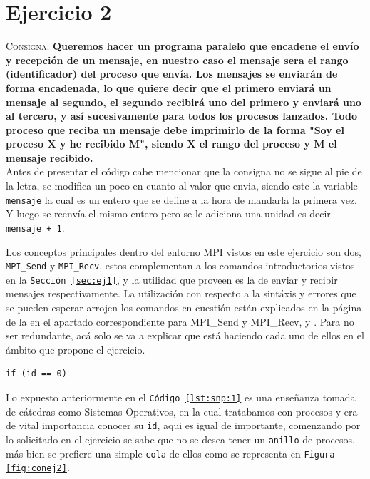 \documentclass{article}
\begin{document}
\section{Ejercicio 2}
\label{sec:ej2}
\textsc{Consigna}: \textbf{Queremos hacer un programa paralelo que encadene el
envío y recepción de un mensaje, en nuestro caso el mensaje sera el rango
(identificador) del proceso que envía.
Los mensajes se enviarán de forma encadenada, lo que quiere decir que el
primero enviará un mensaje al segundo, el segundo recibirá uno del primero y
enviará uno al tercero, y así sucesivamente para todos los procesos lanzados.
Todo proceso que reciba un mensaje debe imprimirlo de la forma "Soy el proceso
X y he recibido M", siendo X el rango del proceso y M el mensaje recibido.
}\\

Antes de presentar el c\'odigo cabe mencionar que la consigna no se sigue al
pie de la letra, se modifica un poco en cuanto al valor que envia, siendo este
la variable \texttt{mensaje} la cual es un entero que se define a la hora de
mandarla la primera vez. Y luego se reenv\'ia el mismo entero pero se le
adiciona una unidad es decir \texttt{mensaje + 1}.



Los conceptos principales dentro del entorno MPI vistos en este ejercicio son
dos, \texttt{MPI\_Send} y \texttt{MPI\_Recv}, estos complementan a los comandos
introductorios vistos en la \texttt{Secci\'on \ref{sec:ej1}}, y la utilidad que
proveen es la de enviar y recibir mensajes respectivamente. La utilizaci\'on
con respecto a la sint\'axis y errores que se pueden esperar arrojen los
comandos en cuesti\'on est\'an explicados en la p\'agina de la \cite{unigranada} en
el apartado correspondiente para MPI\_Send y MPI\_Recv, y \cite{pylp32018}. Para
no ser redundante, ac\'a solo se va a explicar que est\'a haciendo cada uno de
ellos en el \'ambito que propone el ejercicio.

\begin{lstlisting}[caption={ Fragmento de \texttt{C\'odigo \ref{lst:mpi2}}},
label=lst:snp:1, firstnumber=18]
	if (id == 0)
\end{lstlisting}

Lo expuesto anteriormente en el \texttt{C\'odigo \ref{lst:snp:1}} es una
enseñanza tomada de c\'atedras como Sistemas Operativos, en la cual tratabamos
con procesos y era de vital importancia conocer su \texttt{id}, aqui es igual
de importante, comenzando por lo solicitado en el ejercicio se sabe que no se
desea tener un \texttt{anillo} de procesos, m\'as bien se prefiere una simple
\texttt{cola} de ellos como se representa en \texttt{Figura \ref{fig:conej2}}.
\end{document}
